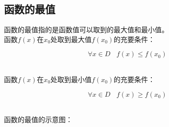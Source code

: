 \documentclass[UTF8]{ctexart}
\begin{document}
\newpage

\subsection{函数的最值}
    函数的最值指的是函数值可以取到的最大值和最小值。\\[3mm]
    函数$f(x)$在$x_0$处取到最大值$f(x_0)$的充要条件：
    \begin{large}
        \begin{equation*}
            \forall x\in D~~~~f(x)\leq f(x_0)
        \end{equation*}
    \end{large}\\
    函数$f(x)$在$x_0$处取到最小值$f(x_0)$的充要条件：
    \begin{large}
        \begin{equation*}
            \forall x\in D~~~~f(x)\geq f(x_0)
        \end{equation*}
    \end{large}\\
    函数的最值的示意图：
\end{document}

